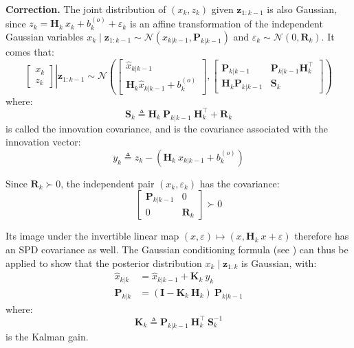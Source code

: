 \textbf{Correction.} The joint distribution of $(x_k,z_k)$ given $\mathbf{z}_{1:k-1}$ is also Gaussian, since $z_k=\mathbf{H}_k\:x_k+b_k^{(o)}+\varepsilon_k$ is an affine transformation of the independent Gaussian variables $x_k\mid\mathbf{z}_{1:k-1}\sim\mathcal{N}\left(\hat{x}_{k|k-1},\mathbf{P}_{k|k-1}\right)$ and $\varepsilon_k\sim\mathcal{N}(0,\mathbf{R}_k)$. It comes that:
\begin{equation}
	\left.\begin{bmatrix}
	x_k\\z_k
	\end{bmatrix}\right|
	\mathbf{z}_{1:k-1}\sim\mathcal{N}
	\left(\begin{bmatrix}
	\hat{x}_{k|k-1}\\\mathbf{H}_k\hat{x}_{k|k-1}+b_k^{(o)}
	\end{bmatrix},
	\begin{bmatrix}
	\mathbf{P}_{k|k-1}&\mathbf{P}_{k|k-1}\mathbf{H}_k^\top\\
	\mathbf{H}_k \mathbf{P}_{k|k-1}&\mathbf{S}_k
	\end{bmatrix}\right)
\end{equation}
where:
\begin{equation}
	\mathbf{S}_k\triangleq \mathbf{H}_k\:\mathbf{P}_{k|k-1}\:\mathbf{H}_k^\top+\mathbf{R}_k
\end{equation}
is called the innovation covariance, and is the covariance associated with the innovation vector:
\begin{equation}
	y_k\triangleq z_k-\left(\mathbf{H}_k\:\hat{x}_{k|k-1}+b_k^{(o)}\right)
\end{equation}

Since $\mathbf{R}_k\succ0$, the independent pair $(x_k,\varepsilon_k)$ has the covariance:
\begin{equation}
	\begin{bmatrix}
	\mathbf{P}_{k|k-1}&0\\0&\mathbf{R}_k
	\end{bmatrix}\succ0
\end{equation}

Its image under the invertible linear map $(x,\varepsilon)\mapsto(x,\mathbf{H}_k\:x+\varepsilon)$ therefore has an SPD covariance as well. The Gaussian conditioning formula (see ) can thus be applied to show that the posterior distribution $x_k\mid\mathbf{z}_{1:k}$ is Gaussian, with:
\begin{align}
	\hat{x}_{k|k}&=\hat{x}_{k|k-1}+\mathbf{K}_k\:y_k\\
	\mathbf{P}_{k|k}&=(\mathbf{I}-\mathbf{K}_k\:\mathbf{H}_k)\:\mathbf{P}_{k|k-1}
\end{align}
where:
\begin{equation}
	\mathbf{K}_k\triangleq \mathbf{P}_{k|k-1}\:\mathbf{H}_k^\top\:\mathbf{S}_k^{-1}
\end{equation}
is the Kalman gain.

